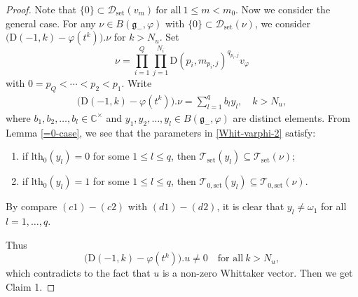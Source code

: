 \documentclass[12pt, a4paper]{amsart}
\newcommand{\fg}{\mathfrak g}
\newcommand{\C}{\mathbb{C}}
\newcommand{\Z}{\mathbb Z}
\newcommand{\rD}{\mathrm{D}}
\theoremstyle{Theorem}
\theoremstyle{Theorem}
\numberwithin{equation}{section}
\begin{document}
\begin{proof}
\vspace{3mm}

Note that $\{0\}\subset\mathcal{D}_{\mathrm{set}}(v_{m})\ \text{for all}\ 1\leq m< m_{0}$.
Now we consider the general case. For any $\nu\in B(\fg_{-},\varphi)$ with $\{0\}\subset\mathcal{D}_{\mathrm{set}}(\nu)$,
we consider
$\big(\rD(-1,k)-\varphi(t^{k})\big).\nu$ for $k>N_{u}$. Set \[\nu=\prod_{i=1}^{Q}\prod_{j=1}^{N_{i}}
\rD(p_{i},m_{p_{i},j})^{q_{p_{i},j}}v_{\varphi}\]
with $0=p_{Q}<\cdots<p_{2}<p_{1}$.
Write
\begin{eqnarray}\label{Whit-varphi-2}
\big(\rD(-1,k)-\varphi(t^{k})\big).\nu=\sum_{l=1}^{q}b_{l}y_{l},\quad k>N_{u},
\end{eqnarray}
where $b_{1},b_{2},\dots,b_{l}\in\C^{\times}$ and $y_{1},y_{2},\dots,y_{l}\in B(\fg_{-},\varphi)$ are distinct elements.
From Lemma \ref{=0-case}, we see that the parameters in \eqref{Whit-varphi-2} satisfy:
\begin{enumerate}
\item[(d1)] if $\mathrm{lth}_{0}(y_l)=0$ for some $1\leq l\leq q$, then
$\mathcal{T}_{\mathrm{set}}(y_{l})\subseteq\mathcal{T}_{\mathrm{set}}(\nu)$;
\item[(d2)] if $\mathrm{lth}_{0}(y_{l})=1$ for some $1\leq l\leq q$, then
$\mathcal{T}_{0,\mathrm{set}}(y_{l})\subseteq\mathcal{T}_{0,\mathrm{set}}(\nu)$.
\end{enumerate}
By compare $(c1)-(c2)$ with $(d1)-(d2)$, it is clear that $y_{l}\neq\omega_{1}$ for all $l=1,\dots,q$.

Thus
\[\big(\rD(-1,k)-\varphi(t^{k})\big).u\neq0\quad\text{for all}\ k>N_{u},\]
which contradicts to the fact that $u$ is a non-zero Whittaker vector. Then we get Claim 1.


\end{proof}
\end{document}
